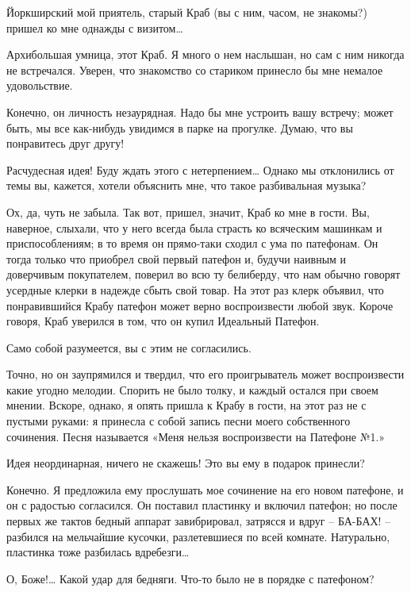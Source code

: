 \documentclass[../main.tex]{subfiles}
\begin{document}
\begin{Dialogue}
 Йоркширский мой приятель, старый Краб (вы с ним, часом, не знакомы?) пришел ко мне однажды с визитом\ldots{}

 {\Large А}рхибольшая умница, этот Краб. Я много о нем наслышан, но сам с ним никогда не встречался. Уверен, что знакомство со стариком принесло бы мне немалое удовольствие.

 Конечно, он личность незаурядная. Надо бы мне устроить вашу встречу; может быть, мы все как-нибудь увидимся в парке на прогулке. Думаю, что вы понравитесь друг другу!

 Расчудесная идея! Буду ждать этого с нетерпением\ldots{} Однако мы отклонились от темы вы, кажется, хотели объяснить мне, что такое разбивальная музыка?

 Ох, да, чуть не забыла. Так вот, пришел, значит, Краб ко мне в гости. Вы, наверное, слыхали, что у него всегда была страсть ко всяческим машинкам и приспособлениям; в то время он прямо-таки сходил с ума по патефонам. Он тогда только что приобрел свой первый патефон и, будучи наивным и доверчивым покупателем, поверил во всю ту белиберду, что нам обычно говорят усердные клерки в надежде сбыть свой товар. На этот раз клерк объявил, что понравившийся Крабу патефон может верно воспроизвести любой звук. Короче говоря, Краб уверился в том, что он купил Идеальный Патефон.

 Само собой разумеется, вы с этим не согласились.

 Точно, но он заупрямился и твердил, что его проигрыватель может воспроизвести какие угодно мелодии. Спорить не было толку, и каждый остался при своем мнении. Вскоре, однако, я опять пришла к Крабу в гости, на этот раз не с пустыми руками: я принесла с собой запись песни моего собственного сочинения. Песня называется «Меня нельзя воспроизвести на Патефоне №1.»

 Идея неординарная, ничего не скажешь! Это вы ему в подарок принесли?

 Конечно. Я предложила ему прослушать мое сочинение на его новом патефоне, и он с радостью согласился. Он поставил пластинку и включил патефон; но после первых же тактов бедный аппарат завибрировал, затрясся и вдруг \--- БА-БАХ! \--- разбился на мельчайшие кусочки, разлетевшиеся по всей комнате. Натурально, пластинка тоже разбилась вдребезги\ldots{}

 О, Боже!\ldots{} Какой удар для бедняги. Что-то было не в порядке с патефоном?


\end{Dialogue}
\end{document}
